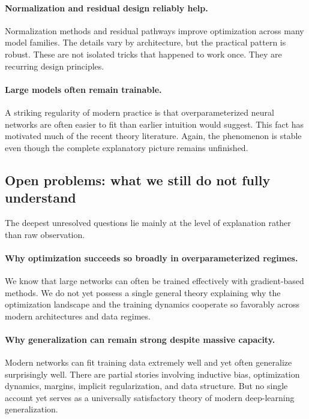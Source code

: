 \paragraph{Normalization and residual design reliably help.}
Normalization methods and residual pathways improve optimization across many model families.
The details vary by architecture, but the practical pattern is robust.
These are not isolated tricks that happened to work once.
They are recurring design principles.

\paragraph{Large models often remain trainable.}
A striking regularity of modern practice is that overparameterized neural networks are often easier to fit than earlier intuition would suggest.
This fact has motivated much of the recent theory literature.
Again, the phenomenon is stable even though the complete explanatory picture remains unfinished.

\subsection*{Open problems: what we still do not fully understand}

The deepest unresolved questions lie mainly at the level of explanation rather than raw observation.

\paragraph{Why optimization succeeds so broadly in overparameterized regimes.}
We know that large networks can often be trained effectively with gradient-based methods.
We do not yet possess a single general theory explaining why the optimization landscape and the training dynamics cooperate so favorably across modern architectures and data regimes.

\paragraph{Why generalization can remain strong despite massive capacity.}
Modern networks can fit training data extremely well and yet often generalize surprisingly well.
There are partial stories involving inductive bias, optimization dynamics, margins, implicit regularization, and data structure.
But no single account yet serves as a universally satisfactory theory of modern deep-learning generalization.

